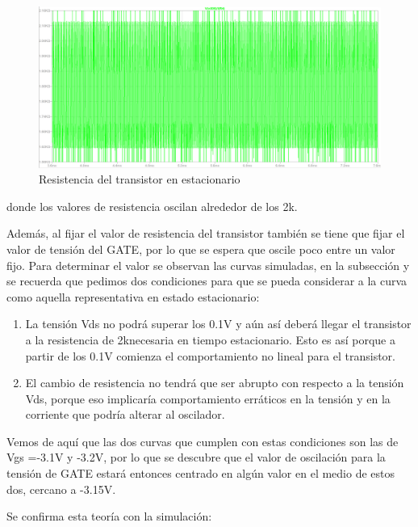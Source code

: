 \documentclass[../../tc_tp6_main.tex]{subfiles}
\begin{document}
\begin{figure}[H]	
	\centering
	\includegraphics[scale=0.5]{imagenes/resistencia_trans_simulada.png}
	\caption{Resistencia del transistor en estacionario}
	\label{fig:ej1_resistencia_trans_simulada}
\end{figure}

donde los valores de resistencia oscilan alrededor de los 2k\ohm.\par

Además, al fijar el valor de resistencia del transistor también se tiene que fijar el valor de tensión del GATE, por lo que se espera que oscile poco entre un valor fijo. Para determinar el valor se observan las curvas simuladas, en la subsección  y se recuerda que pedimos dos condiciones para que se pueda considerar a la curva como aquella representativa en estado estacionario:
\begin{enumerate}
\item La tensión Vds no podrá superar los 0.1V y aún así deberá llegar el transistor a la resistencia de 2k\ohm necesaria en tiempo estacionario. Esto es así porque a partir de los 0.1V comienza el comportamiento no lineal para el transistor.
\item El cambio de resistencia no tendrá que ser abrupto con respecto a la tensión Vds, porque eso implicaría comportamiento erráticos en la tensión y en la corriente que podría alterar al oscilador. 
\end{enumerate}
Vemos de aquí que las dos curvas que cumplen con estas condiciones son las de Vgs =-3.1V y -3.2V,  por lo que se descubre que el valor de oscilación para la tensión de GATE estará entonces centrado en algún valor en el medio de estos dos, cercano a -3.15V.\par
Se confirma esta teoría con la simulación:
\end{document}

